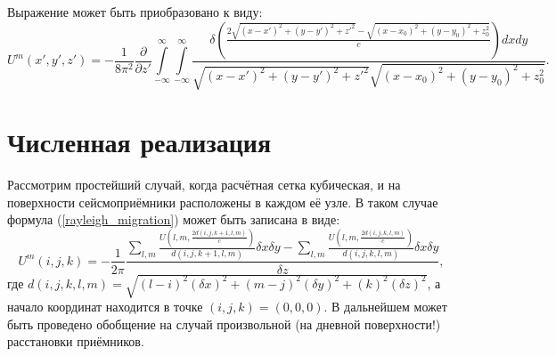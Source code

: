 \documentclass{article}
\begin{document}
Выражение может быть приобразовано к виду:
\begin{equation}
\label{point_source_migrated_xy}
U^m(x',y',z') = -\frac{1}{8\pi^2}\frac{\partial}{\partial z'} \int\limits_{-\infty}^{\infty} \int\limits_{-\infty}^{\infty} \frac{\delta(\frac{2\sqrt{(x-x')^2 + (y-y')^2 + z'^2} - \sqrt{(x-x_0)^2 + (y-y_0)^2 + z_0^2}}{c})dxdy}{\sqrt{(x-x')^2 + (y-y')^2 + z'^2}\sqrt{(x-x_0)^2 + (y-y_0)^2 + z_0^2}}.
\end{equation}


\section{Численная реализация}

Рассмотрим простейший случай, когда расчётная сетка кубическая, и на поверхности сейсмоприёмники расположены в каждом её узле.
В таком случае формула (\ref{rayleigh_migration}) может быть записана в виде:
\begin{equation}
\label{rayleigh_migration_discrete}
U^m(i,j,k) = -\frac{1}{2\pi}\frac{\sum\limits_{l,m} \frac{U(l,m,\frac{2d(i,j,k+1,l,m)}{c})}{d(i,j,k+1,l,m)}\delta x \delta y - \sum\limits_{l,m} \frac{U(l,m,\frac{2d(i,j,k,l,m)}{c})}{d(i,j,k,l,m)}\delta x \delta y}{\delta z},
\end{equation}
где $d(i,j,k,l,m)=\sqrt{(l-i)^2(\delta x)^2 + (m-j)^2(\delta y)^2  + (k)^2(\delta z)^2}$, а начало координат находится в точке $(i,j,k)=(0,0,0)$.
В дальнейшем может быть проведено обобщение на случай произвольной (на дневной поверхности!) расстановки приёмников.
\end{document}
